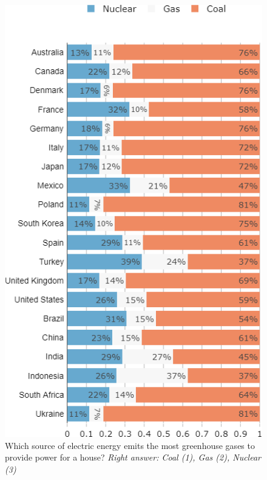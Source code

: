 \begin{frame}{}%
	\begin{figure}
	\caption{Which source of electric energy emits the most greenhouse gases to provide power for a house?
	\newline \footnotesize{\textit{Right answer: Coal (1), Gas (2), Nuclear (3)}}}
	\includegraphics[height=.8\paperheight]{../figures/country_comparison/footprint_elec_countries_most.png}
	\end{figure}
	\end{frame}
	
